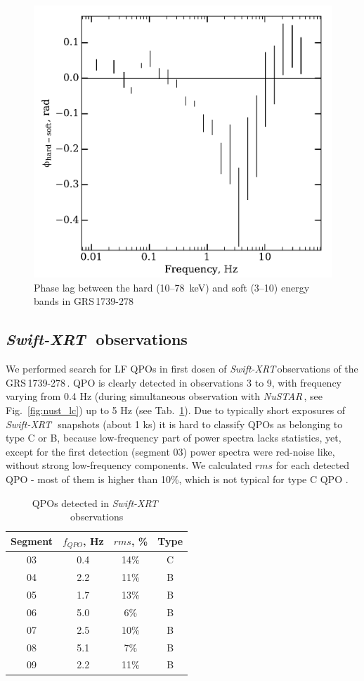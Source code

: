 \documentclass[a4paper,fleqn,usenatbib]{mnras}
\def\grs{{GRS\,1739-278\,}}
\def\swiftx{{\em Swift-XRT\,}}
\def\nustar{{\em NuSTAR\,}}
\begin{document}
\begin{figure}
        \includegraphics[width=\columnwidth]{Phase_lag.pdf}
        \caption{Phase lag between the hard (10--78~keV) and soft (3--10) energy bands in \grs}
        \label{fig:phase_lag}
\end{figure}

\subsection{\swiftx\, observations}
We performed search for LF QPOs in first dosen of \swiftx observations of the \grs. QPO is clearly detected in observations 3 to 9, with frequency varying from 0.4 Hz (during simultaneous observation with \nustar, see Fig.~\ref{fig:nust_lc}) up to 5 Hz (see Tab.~\ref{tab:xrtqpo}). Due to typically short exposures of \swiftx\, snapshots (about 1 ks) it is hard to classify QPOs as belonging to type C or B, because low-frequency part of power spectra lacks statistics, yet, except for the first detection (segment 03) power spectra were red-noise like, without strong low-frequency components. We calculated $rms$ for each detected QPO - most of them is higher than 10\%, which is not typical for type C QPO \citep{casella05}.

\begin{table}
\noindent
\centering
\caption{QPOs detected in \swiftx\, observations}
\label{tab:xrtqpo}
\centering
\begin{tabular}{|c|c|c|c|}
\hline\hline
Segment & $f_{QPO}$, Hz & $rms$, \% & Type\\
\hline
03  &  0.4  &  14\% & C\\
04  &  2.2 &  11\% & B\\
05  &  1.7  & 13\% & B \\ 
06  &  5.0 &   6\% & B\\
07  &  2.5 &  10\% &  B\\ 
08  &  5.1 &   7\% & B\\
09  &  2.2 &  11\% &  B\\
\hline
\end{tabular}
\end{table}
\end{document}
